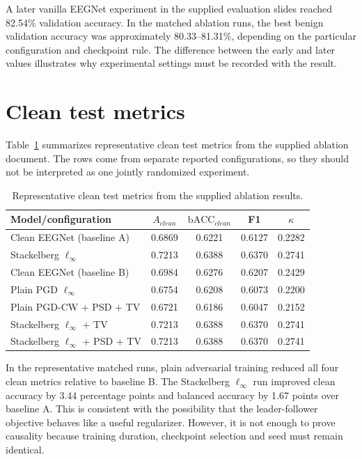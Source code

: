 \documentclass[10pt,a4paper,openright]{report}
\newcommand{\bacc}{\mathrm{bACC}}
\begin{document}
A later vanilla EEGNet experiment in the supplied evaluation slides reached 82.54\% validation accuracy. In the matched ablation runs, the best benign validation accuracy was approximately 80.33--81.31\%, depending on the particular configuration and checkpoint rule. The difference between the early and later values illustrates why experimental settings must be recorded with the result.

\section{Clean test metrics}
Table~\ref{tab:clean-results} summarizes representative clean test metrics from the supplied ablation document. The rows come from separate reported configurations, so they should not be interpreted as one jointly randomized experiment.

\begin{table}[H]
\centering
\small
\caption{Representative clean test metrics from the supplied ablation results.}
\label{tab:clean-results}
\begin{tabular}{lcccc}
\toprule
Model/configuration & $A_{clean}$ & $\bacc_{clean}$ & F1 & $\kappa$ \\
\midrule
Clean EEGNet (baseline A) & 0.6869 & 0.6221 & 0.6127 & 0.2282 \\
Stackelberg $\ell_\infty$ & 0.7213 & 0.6388 & 0.6370 & 0.2741 \\
Clean EEGNet (baseline B) & 0.6984 & 0.6276 & 0.6207 & 0.2429 \\
Plain PGD $\ell_\infty$ & 0.6754 & 0.6208 & 0.6073 & 0.2200 \\
Plain PGD-CW + PSD + TV & 0.6721 & 0.6186 & 0.6047 & 0.2152 \\
Stackelberg $\ell_\infty$ + TV & 0.7213 & 0.6388 & 0.6370 & 0.2741 \\
Stackelberg $\ell_\infty$ + PSD + TV & 0.7213 & 0.6388 & 0.6370 & 0.2741 \\
\bottomrule
\end{tabular}
\end{table}

In the representative matched runs, plain adversarial training reduced all four clean metrics relative to baseline B. The Stackelberg $\ell_\infty$ run improved clean accuracy by 3.44 percentage points and balanced accuracy by 1.67 points over baseline A. This is consistent with the possibility that the leader-follower objective behaves like a useful regularizer. However, it is not enough to prove causality because training duration, checkpoint selection and seed must remain identical.
\end{document}
